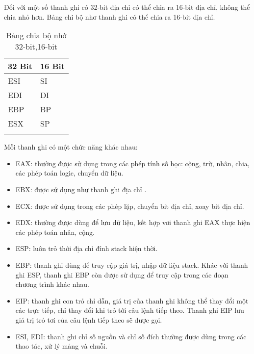 			Đối với một số thanh ghi có 32-bit địa chỉ có thể chia ra 16-bit địa chỉ, không thể chia nhỏ hơn. Bảng chi bộ nhơ thanh ghi có thể chia ra 16-bit địa chỉ.
			\begin{longtable}{ | m{3cm} | m{3cm} | }
			\hline
				32 Bit & 16 Bit\\
			\hline
			\hline
				ESI & SI\\
			\hline			
				EDI & DI\\
			\hline		
				EBP & BP\\		
			\hline
				ESX & SP\\
			\hline
			\caption{Bảng chia bộ nhớ 32-bit,16-bit}
			\label{table:tbthanhghi}
		\end{longtable}
		
	Mỗi thanh ghi có một chức năng khác nhau: 
\begin{itemize}
	\renewcommand{\labelitemi}{\textbullet}
	\item	EAX: thường được sử dụng trong các phép tính số học: cộng, trừ, nhân, chia, các phép toán logic, chuyển dữ liệu.
	\item EBX: được sử dụng như thanh ghi địa chỉ .
\item	ECX: được sử dụng trong các phép lặp, chuyển bit địa chỉ, xoay bit địa chỉ.
\item	EDX: thường được dùng để lưu dữ liệu, kết hợp vơi thanh ghi EAX thực hiện các phép toán nhân, cộng.
\item	ESP: luôn trỏ thới địa chỉ đỉnh stack hiện thời.
\item	EBP: thanh ghi dùng để truy cập giá trị, nhập dữ liệu stack. Khác với thanh ghi ESP, thanh ghi EBP còn được sử dụng để truy cập trong các đoạn chương trình khác nhau.
\item	EIP: thanh ghi con trỏ chỉ dẫn, giá trị của thanh ghi không thể thay đổi một các trực tiếp, chỉ thay đổi khi trỏ tới câu lệnh tiếp theo. Thanh ghi EIP lưu giá trị trỏ tơi của câu lệnh tiếp theo sẽ được gọi. 
\item	ESI, EDI: thanh ghi chỉ số nguồn và chỉ số đích thường được dùng trong các thao tác, xử lý mảng và chuỗi.
\end{itemize}	
	
